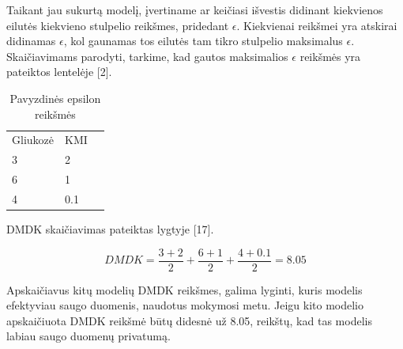 \documentclass{VUMIFInfBakalaurinis}
\begin{document}
\par Taikant jau sukurtą modelį, įvertiname ar keičiasi išvestis didinant kiekvienos eilutės kiekvieno stulpelio reikšmes, pridedant $\epsilon$. Kiekvienai reikšmei yra atskirai didinamas $\epsilon$, kol gaunamas tos eilutės tam tikro stulpelio maksimalus $\epsilon$. Skaičiavimams parodyti, tarkime, kad gautos maksimalios $\epsilon$ reikšmės yra pateiktos lentelėje [2].

\begin{table}[t]
\centering
\begin{tabular}{|l|l|l|}
\cline{1-2}
Gliukozė & KMI \\\cline{1-2}
3      & 2 \\\cline{1-2}
6       & 1 \\\cline{1-2}
4      & 0.1 \\\cline{1-2}
\end{tabular}
\caption{Pavyzdinės epsilon reikšmės}
\label{tab:my-table}
\end{table}

\par DMDK skaičiavimas pateiktas lygtyje [17].

\begin{equation}
DMDK = \frac{3 + 2}{2} + \frac{6 + 1}{2} + \frac{4 + 0.1}{2} = 8.05
\end{equation}

\par Apskaičiavus kitų modelių DMDK reikšmes, galima lyginti, kuris modelis efektyviau saugo duomenis, naudotus mokymosi metu. Jeigu kito modelio apskaičiuota DMDK reikšmė būtų didesnė už 8.05, reikštų, kad tas modelis labiau saugo duomenų privatumą.
\end{document}

